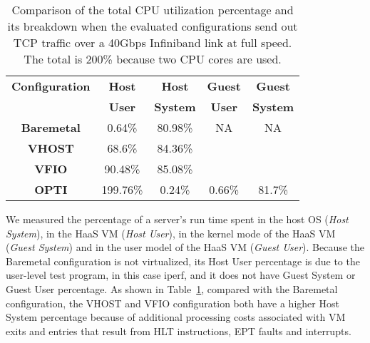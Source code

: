 \begin{table}
\renewcommand{\arraystretch}{1.2}
\small
\begin{center}
\begin{tabular}{|c|c|c|c|c|} \hline
{\bf Configuration} & {\bf Host } & {\bf Host } & {\bf Guest} & {\bf Guest} \\ 
{\bf } & {\bf  User } & {\bf System } & {\bf  User} & {\bf System} \\ \hline
 {\bf Baremetal}    & 0.64\%   & 80.98\% & NA & NA\\ \hline
 {\bf VHOST} & 68.6\%   & 84.36\% &  &  \\ \hline
{\bf VFIO}   & 90.48\%  & 85.08\% &  &  \\ \hline
 {\bf OPTI}  & 199.76\% & 0.24\%  & 0.66\% & 81.7\% \\ \hline 
\end{tabular}
\end{center}
\caption{Comparison of the total CPU utilization percentage and its breakdown 
when the evaluated configurations send out TCP traffic over a
40Gbps Infiniband link at full speed. The total is 200\% because two CPU cores are used.}
\label{tab:cpu_utilization_40gbps}
\end{table}

We measured the percentage of a \na server's run time spent in the host OS ({\em Host System}),
in the HaaS VM ({\em Host User}), in the kernel mode of the HaaS VM ({\em Guest System})
and in the user model  of the HaaS VM ({\em Guest User}).
Because  the Baremetal configuration is not virtualized, its Host User percentage is due to 
the user-level test program, in this case iperf, and it does not have Guest System or 
Guest User percentage.
As shown in Table~\ref{tab:cpu_utilization_40gbps}, compared with the Baremetal configuration, 
the VHOST and VFIO configuration both have a higher Host System percentage because of additional 
processing costs associated with VM exits and entries that result from HLT instructions, EPT faults and interrupts.

